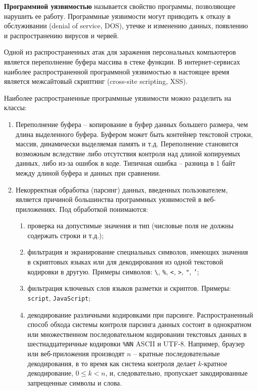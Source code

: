 \documentclass[10pt,a4paper]{book}
\begin{document}
\textbf{Программной уязвимостью} называется свойство программы, позволяющее нарушить ее работу. Программные уязвимости могут приводить к отказу в обслуживании (denial of service, DOS), утечке и изменению данных, появлению и распространению вирусов и червей.

Одной из распространенных атак для заражения персональных компьютеров является переполнение буфера массива в стеке функции. В интернет-сервисах наиболее распространенной программной уязвимостью в настоящее время является межсайтовый скриптинг (cross-site scripting, XSS).

Наиболее распространенные программные уязвимости можно разделить на классы:
\begin{enumerate}
    \item Переполнение буфера -- копирование в буфер данных большего размера, чем длина выделенного буфера. Буфером может быть контейнер текстовой строки, массив, динамически выделяемая память и т.д. Переполнение становится возможным вследствие либо отсутствия контроля над длиной копируемых данных, либо из-за ошибок в коде. Типичная ошибка -- разница в 1 байт между длиной буфера и данных при сравнении.
    \item Некорректная обработка (парсинг) данных, введенных пользователем, является причиной большинства программных уязвимостей в веб-приложениях. Под обработкой понимаются:
        \begin{enumerate}
            \item проверка на допустимые значения и тип (числовые поля не должны содержать строки и т.д.);
            \item фильтрация и экранирование специальных символов, имеющих значения в скриптовых языках или для декодирования из одной текстовой кодировки в другую. Примеры символов: \texttt{\textbackslash},  \texttt{\%}, \texttt{<}, \texttt{>}, \texttt{"},  \texttt{'};
            \item фильтрация ключевых слов языков разметки и скриптов. Примеры: \texttt{script}, \texttt{JavaScript};
            \item декодирование различными кодировками при парсинге. Распространенный способ обхода системы контроля парсинга данных состоит в однократном или множественном последовательном кодировании текстовых данных в шестнадцатеричные кодировки \texttt{\%NN} ASCII и UTF-8. Например, браузер или веб-приложения производят $n$ -- кратные последовательные декодирования, в то время как система контроля делает $k$-кратное декодирование, $0 \leq k < n$,  и, следовательно, пропускает закодированные запрещенные символы и слова.

\end{enumerate}
\end{enumerate}
\end{document}

